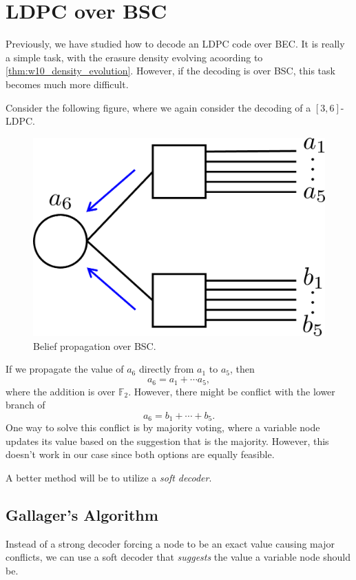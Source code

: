 \section{LDPC over BSC}

Previously, we have studied how to decode an LDPC code over BEC. It is really a simple task, with the erasure density evolving acoording to \autoref{thm:w10_density_evolution}. However, if the decoding is over BSC, this task becomes much more difficult.

Consider the following figure, where we again consider the decoding of a $[3,6]$-LDPC.
\begin{figure}[H]
    \centering
    \includegraphics[width=0.3\linewidth]{figures/w11_LDPC_BSC.png}
    \caption{Belief propagation over BSC.}
    \label{fig:w11_belief_prop_BSC}
\end{figure}
If we propagate the value of $a_6$ directly from $a_1$ to $a_5$, then
\begin{equation*}
    a_6 = a_1 + \cdots a_5,
\end{equation*}
where the addition is over $\mathbb{F}_2$. However, there might be conflict with the lower branch of
\begin{equation*}
    a_6 = b_1 + \cdots + b_5.
\end{equation*}
One way to solve this conflict is by majority voting, where a variable node updates its value based on the suggestion that is the majority. However, this doesn't work in our case since both options are equally feasible.

A better method will be to utilize a \textit{soft decoder}.

\subsection{Gallager's Algorithm}
Instead of a strong decoder forcing a node to be an exact value causing major conflicts, we can use a soft decoder that \textit{suggests} the value a variable node should be.

